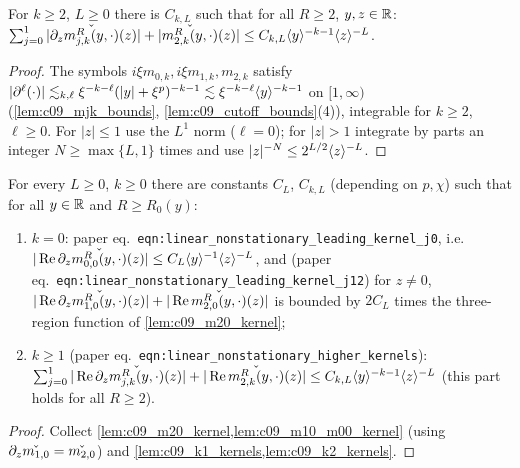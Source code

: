\begin{lemma}
  \label{lem:c09_k2_kernels}
  For $k\ge2$, $L\ge0$ there is $C_{k,L}$ such that for all $R\ge2$, $y,z\in\R$:
  $\sum_{j=0}^1|\partial_z\widecheck{m^R_{j,k}(y,\cdot)}(z)|+|\widecheck{m^R_{2,k}(y,\cdot)}(z)|\le C_{k,L}\ang{y}^{-k-1}\ang{z}^{-L}$.
\end{lemma}
\begin{proof}
  The symbols $i\xi m_{0,k},i\xi m_{1,k},m_{2,k}$ satisfy $|\partial^\ell(\cdot)|\lesssim_{k,\ell}\xi^{-k-\ell}(|y|+\xi^p)^{-k-1}\lesssim\xi^{-k-\ell}\ang y^{-k-1}$ on $[1,\infty)$
  (\cref{lem:c09_mjk_bounds}, \cref{lem:c09_cutoff_bounds}(4)), integrable for $k\ge2$, $\ell\ge0$. For $|z|\le1$ use the $L^1$ norm ($\ell=0$); for $|z|>1$ integrate by
  parts an integer $N\ge\max\{L,1\}$ times and use $|z|^{-N}\le2^{L/2}\ang z^{-L}$.
\end{proof}

\begin{lemma}
  \label{lem:linear_nonstationary_leading_kernels}
  For every $L\ge0$, $k\ge0$ there are constants $C_L$, $C_{k,L}$ (depending on $p,\chi$) such that for all $y\in\R$ and $R\ge R_0(y)$:
  \begin{enumerate}
    \item $k=0$: paper eq.~\texttt{eqn:linear\_nonstationary\_leading\_kernel\_j0}, i.e.\ $|\operatorname{Re}\partial_z\widecheck{m^R_{0,0}(y,\cdot)}(z)|\le C_L\ang y^{-1}\ang z^{-L}$, and
      (paper eq.~\texttt{eqn:linear\_nonstationary\_leading\_kernel\_j12}) for $z\neq0$, $|\operatorname{Re}\partial_z\widecheck{m^R_{1,0}(y,\cdot)}(z)|+|\operatorname{Re}\widecheck{m^R_{2,0}(y,\cdot)}(z)|$ is bounded by $2C_L$ times the
      three-region function of \cref{lem:c09_m20_kernel};
    \item $k\ge1$ (paper eq.~\texttt{eqn:linear\_nonstationary\_higher\_kernels}): $\sum_{j=0}^1|\operatorname{Re}\partial_z\widecheck{m^R_{j,k}(y,\cdot)}(z)|+|\operatorname{Re}\widecheck{m^R_{2,k}(y,\cdot)}(z)|\le C_{k,L}\ang y^{-k-1}\ang z^{-L}$
      (this part holds for all $R\ge2$).
  \end{enumerate}
\end{lemma}
\begin{proof}
  Collect \cref{lem:c09_m20_kernel,lem:c09_m10_m00_kernel} (using $\partial_z\widecheck{m_{1,0}}=\widecheck{m_{2,0}}$) and \cref{lem:c09_k1_kernels,lem:c09_k2_kernels}.
\end{proof}

